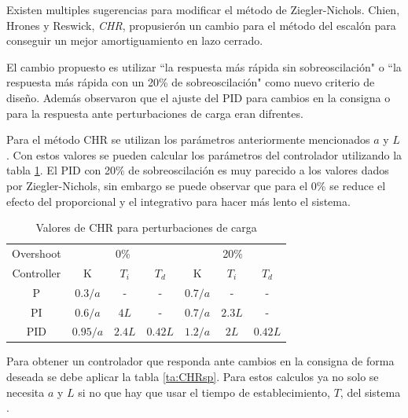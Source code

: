 \documentclass{book}
\begin{document}
Existen multiples sugerencias para modificar el m\'etodo de Ziegler-Nichols. Chien, Hrones y Reswick, \emph{CHR}, propusier\'on un cambio para el m\'etodo del escal\'on para conseguir un mejor amortiguamiento en lazo cerrado. \par

El cambio propuesto es utilizar ``la respuesta m\'as r\'apida sin sobreoscilaci\'on" o ``la respuesta m\'as r\'apida con un 20\% de sobreoscilaci\'on" como nuevo criterio de diseño. Adem\'as observaron que el ajuste del PID para cambios en la consigna o para la respuesta ante perturbaciones de carga eran difrentes. \par

Para el m\'etodo CHR se utilizan los par\'ametros anteriormente mencionados $a$ y $L$. Con estos valores se pueden calcular los par\'ametros del controlador utilizando la tabla \ref{ta:CHRload}. El PID con 20\% de sobreoscilaci\'on es muy parecido a los valores dados por Ziegler-Nichols, sin embargo se puede observar que para el 0\% se reduce el efecto del proporcional y el integrativo para hacer m\'as lento el sistema. \par

\begin{table}[h!]
\centering
\caption{Valores de CHR para perturbaciones de carga \cite{PIDbook}}
\label{ta:CHRload}
\begin{tabular}{@{}c|cccccc@{}}
Overshoot  & \multicolumn{3}{c}{0\%}      & \multicolumn{3}{c}{20\%}    \\
Controller & K        & $T_{i}$ & $T_{d}$ & K       & $T_{i}$ & $T_{d}$ \\ \hline
P          & $0.3/a$  & -       & -       & $0.7/a$ & -       & -       \\
PI         & $0.6/a$  & $4L$    & -       & $0.7/a$ & $2.3L$  & -       \\
PID        & $0.95/a$ & $2.4L$  & $0.42L$ & $1.2/a$ & $2L$    & $0.42L$ \\ 
\end{tabular}
\end{table} 

Para obtener un controlador que responda ante cambios en la consigna de forma deseada se debe aplicar la tabla \ref{ta:CHRsp}. Para estos calculos ya no solo se necesita $a$ y $L$ si no que hay que usar el tiempo de establecimiento, $T$, del sistema \cite{PIDbook}. \par
\end{document}
